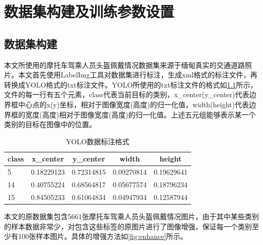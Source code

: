 \chapter{数据集构建及训练参数设置}

\section{数据集构建}
本文所使用的摩托车驾乘人员头盔佩戴情况数据集来源于缅甸真实的交通道路照片。本文首先使用LabelImg工具对数据集进行标注，生成xml格式的标注文件，再转换成YOLO格式的txt标注文件。YOLO所使用的txt标注文件的格式如\ref{tab:format}所示，文件的每一行有五个元素，class代表当前目标的类别，x\_center(y\_center)代表边界框中心点的x(y)坐标，相对于图像宽度(高度)的归一化值，width(height)代表边界框的宽度(高度)相对于图像宽度(高度)的归一化值。上述五元组能够表示某一个类别的目标在图像中的位置。

\begin{table}[htb]
      \centering
      \caption[目标数据]{YOLO数据标注格式\label{tab:format}}
      \begin{tabular}{lrrrr}
          \toprule
          \multicolumn{1}{c}{class} & \multicolumn{1}{c}{x\_center} & \multicolumn{1}{c}{y\_center} & \multicolumn{1}{c}{width} & \multicolumn{1}{c}{height} \\
          \midrule
          5 & 0.18229123 & 0.72314815 & 0.09270814 & 0.19629641 \\
          14 & 0.40755224 & 0.68564817 & 0.05677574 & 0.18796234 \\
          15 & 0.84505233 & 0.61064834 & 0.04947934 & 0.12587944 \\
          \bottomrule
      \end{tabular}
\end{table}


本文的原数据集包含5661张摩托车驾乘人员头盔佩戴情况图片，由于其中某些类别的样本数据非常少，对包含这些标签的原图片进行了图像增强，保证每一个类别至少有100张样本图片。具体的增强方法如\ref{fig:enhance}所示。

